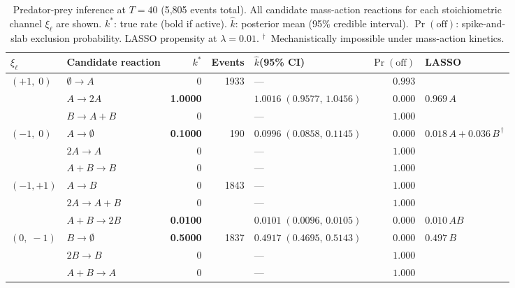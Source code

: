 \begin{table}[htbp]
\centering
\small
\caption{Predator-prey inference at $T=40$ (5{,}805 events total). All candidate mass-action reactions for each stoichiometric channel $\xi_\ell$ are shown. $k^*$: true rate (bold if active). $\hat{k}$: posterior mean (95\% credible interval). $\Pr(\text{off})$: spike-and-slab exclusion probability. LASSO propensity at $\lambda=0.01$. $^\dagger$~Mechanistically impossible under mass-action kinetics.}
\label{tab:predprey_detail}
\begin{tabular}{l l r r l r l}
\toprule
$\xi_\ell$ & Candidate reaction & $k^*$ & Events & $\hat{k}$\;(95\% CI) & $\Pr(\text{off})$ & LASSO \\
\midrule
\multirow{3}{*}{$(+1,\;0)$} & $\emptyset\to A$ & $0$ & 1933 & --- & $0.993$ &  \\
 & $A\to 2A$ & \textbf{1.0000} &  & $1.0016\;(0.9577,\,1.0456)$ & $0.000$ & $0.969\,A$ \\
 & $B\to A+B$ & $0$ &  & --- & $1.000$ &  \\
\midrule
\multirow{3}{*}{$(-1,\;0)$} & $A\to \emptyset$ & \textbf{0.1000} & 190 & $0.0996\;(0.0858,\,0.1145)$ & $0.000$ & $0.018\,A + 0.036\,B^{\,\dagger}$ \\
 & $2A\to A$ & $0$ &  & --- & $1.000$ &  \\
 & $A+B\to B$ & $0$ &  & --- & $1.000$ &  \\
\midrule
\multirow{3}{*}{$(-1,+1)$} & $A\to B$ & $0$ & 1843 & --- & $1.000$ &  \\
 & $2A\to A+B$ & $0$ &  & --- & $1.000$ &  \\
 & $A+B\to 2B$ & \textbf{0.0100} &  & $0.0101\;(0.0096,\,0.0105)$ & $0.000$ & $0.010\,AB$ \\
\midrule
\multirow{3}{*}{$(0,\;-1)$} & $B\to \emptyset$ & \textbf{0.5000} & 1837 & $0.4917\;(0.4695,\,0.5143)$ & $0.000$ & $0.497\,B$ \\
 & $2B\to B$ & $0$ &  & --- & $1.000$ &  \\
 & $A+B\to A$ & $0$ &  & --- & $1.000$ &  \\
\bottomrule
\end{tabular}
\end{table}